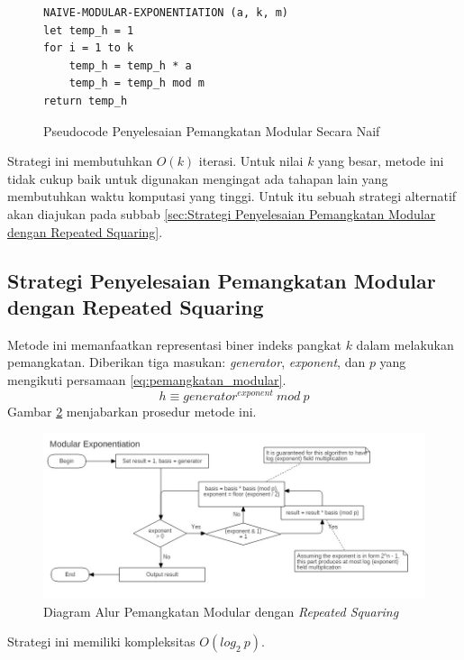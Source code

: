 \begin{figure}
\begin{lstlisting}[firstnumber=0]
NAIVE-MODULAR-EXPONENTIATION (a, k, m)
let temp_h = 1
for i = 1 to k
	temp_h = temp_h * a
	temp_h = temp_h mod m
return temp_h
\end{lstlisting}
\caption{Pseudocode Penyelesaian Pemangkatan Modular Secara Naif}
\label{psdo:modex_naive}
\end{figure}

Strategi ini membutuhkan $O(k)$ iterasi. Untuk nilai $k$ yang besar, metode ini tidak cukup baik untuk digunakan mengingat ada tahapan lain yang membutuhkan waktu komputasi yang tinggi. Untuk itu sebuah strategi alternatif akan diajukan pada subbab \ref{sec:Strategi Penyelesaian Pemangkatan Modular dengan Repeated Squaring}.

\subsection{ Strategi Penyelesaian Pemangkatan Modular dengan Repeated Squaring}

Metode ini memanfaatkan representasi biner indeks pangkat $k$ dalam melakukan pemangkatan. Diberikan tiga masukan: \textit{generator}, \textit{exponent}, dan $p$ yang mengikuti persamaan \eqref{eq:pemangkatan_modular}.
\begin{equation}
	h \equiv generator^{exponent}\ mod\ p
	\label{eq:pemangkatan_modular_repeated_squaring}
\end{equation}
Gambar \ref{fig:repeated_squaring} menjabarkan prosedur metode ini.
\begin{figure}
	\Centering
	\includegraphics[scale=0.5,angle=90]{bab2/img/modular-exponentiation}
	\caption{Diagram Alur Pemangkatan Modular dengan \textit{Repeated Squaring}}
	\label{fig:repeated_squaring}
\end{figure}

Strategi ini memiliki kompleksitas $O\left(log_2\ p\right)$.

